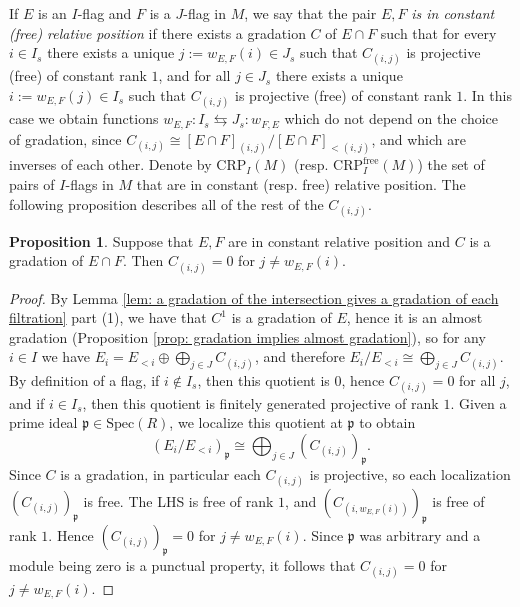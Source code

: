 \documentclass[oneside,11pt]{amsart}
\newcommand{\fp}{\ensuremath{\mathfrak{p}}}
\newcommand{\free}{\ensuremath{\text{free}}}
\newcommand{\CRP}{\ensuremath{\text{CRP}}}
\newcommand{\Spec}{\ensuremath{\text{Spec}}}
\theoremstyle{definition}
\newtheorem{proof techniques}{Proof Techniques}
\newtheorem{proposition}{Proposition}
\begin{document}
If $E$ is an $I$-flag and $F$ is a $J$-flag in $M$, we say that the pair $E , F$ \emph{is in constant (free) relative position} if there exists a gradation $C$ of $E \cap F$ such that for every $i \in I_s$ there exists a unique $j := w_{E , F}(i) \in J_s$ such that $C_{(i , j)}$ is projective (free) of constant rank $1$, and for all $j \in J_s$ there exists a unique $i := w_{E , F}(j) \in I_s$ such that $C_{(i , j)}$ is projective (free) of constant rank $1$. In this case we obtain functions $w_{E , F} : I_s \leftrightarrows J_s: w_{F , E}$ which do not depend on the choice of gradation, since $C_{(i , j)} \cong [E \cap F]_{(i , j)}  /  [ E \cap F ]_{< (i , j)}$, and which are inverses of each other. Denote by $\CRP_I(M)$ (resp. $\CRP_I^\free(M)$) the set of pairs of $I$-flags in $M$ that are in constant (resp. free) relative position. The following proposition describes all of the rest of the $C_{(i , j)}$. 

\begin{proposition}\label{prop: all non chosen pairs are zero for constant relative position}
Suppose that $E , F$ are in constant relative position and $C$ is a gradation of $E \cap F$. Then $C_{(i , j)} = 0$ for $j \neq w_{E, F}(i)$. 
\end{proposition}

\begin{proof}
By Lemma \ref{lem: a gradation of the intersection gives a gradation of each filtration} part (1), we have that $C^1$ is a gradation of $E$, hence it is an almost gradation (Proposition \ref{prop: gradation implies almost gradation}), so for any $i \in I$ we have $E_i = E_{<i} \oplus \bigoplus_{j \in J} C_{(i , j)}$, and therefore $E_i / E_{<i} \cong \bigoplus_{j \in J} C_{(i , j)}$. By definition of a flag, if $i \notin I_s$, then this quotient is $0$, hence $C_{(i , j)} = 0$ for all $j$, and if $i \in I_s$, then this quotient is finitely generated projective of rank $1$. Given a prime ideal $\fp \in \Spec(R)$, we localize this quotient at $\fp$ to obtain 
\begin{equation*}
( E_i / E_{<i} )_\fp \cong \bigoplus_{j \in J} (C_{(i , j)})_\fp. 
\end{equation*}
Since $C$ is a gradation, in particular each $C_{(i , j)}$ is projective, so each localization $(C_{(i , j)})_\fp$ is free. The LHS is free of rank $1$, and $(C_{(i , w_{E , F}(i))})_\fp$ is free of rank $1$. Hence $(C_{(i , j)})_\fp = 0$ for $j \neq w_{E, F}(i)$. Since $\fp$ was arbitrary and a module being zero is a punctual property, it follows that $C_{(i , j)} = 0$ for $j \neq w_{E, F}(i)$. 
\end{proof}
\end{document}
